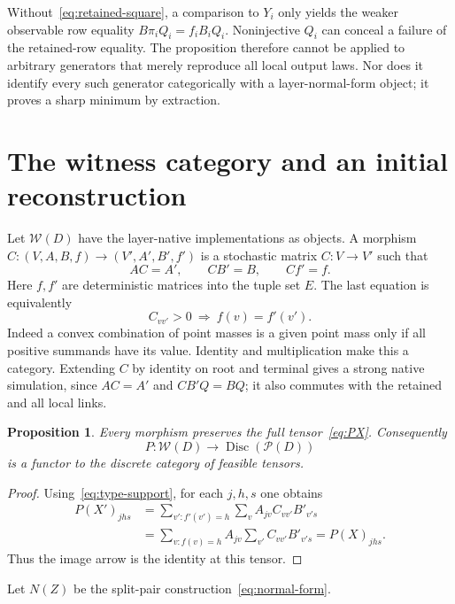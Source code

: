 \documentclass[11pt]{article}
\newcommand{\W}{\mathcal W}
\newcommand{\Pcal}{\mathcal P}
\newtheorem{proposition}[theorem]{Proposition}
\theoremstyle{remark}
\begin{document}
Without~\eqref{eq:retained-square}, a comparison to $Y_i$ only yields the weaker observable row equality $B\pi_iQ_i=f_iB_iQ_i$. Noninjective $Q_i$ can conceal a failure of the retained-row equality. The proposition therefore cannot be applied to arbitrary generators that merely reproduce all local output laws. Nor does it identify every such generator categorically with a layer-normal-form object; it proves a sharp minimum by extraction.

\section{The witness category and an initial reconstruction}\label{sec:initial}

Let $\W(D)$ have the layer-native implementations as objects. A morphism
$C:(V,A,B,f)\to(V',A',B',f')$ is a stochastic matrix $C:V\to V'$ such that
\begin{equation}\label{eq:witness-arrow}
 AC=A',\qquad CB'=B,\qquad Cf'=f.
\end{equation}
Here $f,f'$ are deterministic matrices into the tuple set $E$. The last equation is equivalently
\begin{equation}\label{eq:type-support}
 C_{vv'}>0\ \Longrightarrow\ f(v)=f'(v').
\end{equation}
Indeed a convex combination of point masses is a given point mass only if all positive summands have its value. Identity and multiplication make this a category. Extending $C$ by identity on root and terminal gives a strong native simulation, since $AC=A'$ and $CB'Q=BQ$; it also commutes with the retained and all local links.

\begin{proposition}\label{prop:tensor-functor}
Every morphism preserves the full tensor~\eqref{eq:PX}. Consequently
\[
 P:\W(D)\longrightarrow\operatorname{Disc}(\Pcal(D))
\]
is a functor to the discrete category of feasible tensors.
\end{proposition}
\begin{proof}
Using~\eqref{eq:type-support}, for each $j,h,s$ one obtains
\begin{align*}
 P(X')_{jhs}
 &=\sum_{v':f'(v')=h}\sum_vA_{jv}C_{vv'}B'_{v's}\\
 &=\sum_{v:f(v)=h}A_{jv}\sum_{v'}C_{vv'}B'_{v's}
 =P(X)_{jhs}.
\end{align*}
Thus the image arrow is the identity at this tensor.
\end{proof}

Let $N(Z)$ be the split-pair construction~\eqref{eq:normal-form}.
\end{document}
